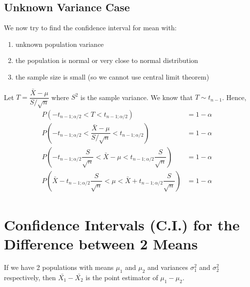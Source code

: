 \subsection{Unknown Variance Case}
We now try to find the confidence interval for mean with:
\begin{enumerate}
    \item unknown population variance
    \item the population is normal or very close to normal distribution
    \item the sample size is small (so we cannot use central limit theorem)
\end{enumerate}
Let $T = \dfrac{\bar{X} - \mu }{S/\sqrt{n}}$ where $S^2$ is the sample variance. We know that $T \sim t_{n-1}$. Hence, 
\begin{equation*}
    \begin{split}
        P\left( -t_{n - 1; \alpha/2} < T < t_{n-1; \alpha/2} \right) &= 1 - \alpha \\
        P\left( -t_{n - 1; \alpha/2} < \dfrac{\bar{X} - \mu }{S/\sqrt{n}} < t_{n-1; \alpha/2} \right) &= 1 - \alpha \\
        P\left( -t_{n - 1; \alpha/2}\dfrac{S}{\sqrt{n}} < \bar{X} - \mu < t_{n-1; \alpha/2}\dfrac{S}{\sqrt{n}}  \right) &= 1 - \alpha \\
        P\left(\bar{X} - t_{n - 1; \alpha/2}\dfrac{S}{\sqrt{n}} < \mu <\bar{X} + t_{n-1; \alpha/2}\dfrac{S}{\sqrt{n}}  \right) &= 1 - \alpha \\
    \end{split}
\end{equation*}

\section{Confidence Intervals (C.I.) for the Difference between 2 Means}
If we have 2 populations with means $\mu_1$ and $\mu_2$ and variances $\sigma_1^2$ and $\sigma_2^2$ respectively, then $\bar{X_1} - \bar{X_2}$ is the point estimator of $\mu_1 - \mu_2$.
